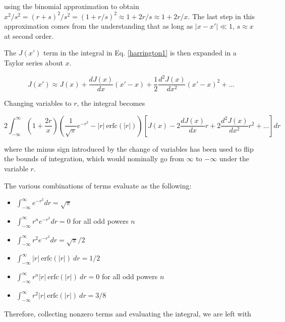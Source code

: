 \documentclass[onecolumn]{aastex63}
\begin{document}
using the binomial approximation to obtain $x^2/s^2 = (r+s)^2/s^2 = (1+r/s)^2 \approx 1 + 2r/s \approx 1 + 2r/x$. The last step in this approximation comes from the understanding that as long as $|x-x'|\ll 1$, $s \approx x$ at second order.

The $J(x')$ term in the integral in Eq. \ref{harrington1} is then expanded in a Taylor series about $x$.

\begin{equation}
    J(x') \approx J(x) + \frac{dJ(x)}{dx}(x' - x) + \frac{1}{2}\frac{d^2J(x)}{dx^2}(x'-x)^2 + ...
\end{equation}

Changing variables to $r$, the integral becomes

\begin{equation}
    2 \int_{-\infty}^{\infty} \left(1+\frac{2r}{x}\right)\left(\frac{1}{\sqrt{\pi}}e^{-r^2} - |r|\ \mathrm{erfc}(|r|)\right)\left[J(x) - 2\frac{dJ(x)}{dx}r + 2\frac{d^2J(x)}{dx^2}r^2 + ...\right] dr
\end{equation}

where the minus sign introduced by the change of variables has been used to flip the bounds of integration, which would nominally go from $\infty$ to $-\infty$ under the variable $r$.

The various combinations of terms evaluate as the following:

\begin{itemize}
    \item $\int_{-\infty}^{\infty} e^{-r^2} dr = \sqrt{\pi}$
    \item $\int_{-\infty}^{\infty} r^{n} e^{-r^2} dr = 0$ for all odd powers $n$
    \item $\int_{-\infty}^{\infty} r^2 e^{-r^2} dr = \sqrt{\pi}/2$
    \item $\int_{-\infty}^{\infty} |r|\ \mathrm{erfc}(|r|)\ dr = 1/2$
    \item $\int_{-\infty}^{\infty} r^n |r|\ \mathrm{erfc}(|r|)\ dr = 0$ for all odd powers $n$
    \item $\int_{-\infty}^{\infty} r^2 |r|\ \mathrm{erfc}(|r|)\ dr = 3/8$
\end{itemize}

Therefore, collecting nonzero terms and evaluating the integral, we are left with
\end{document}
